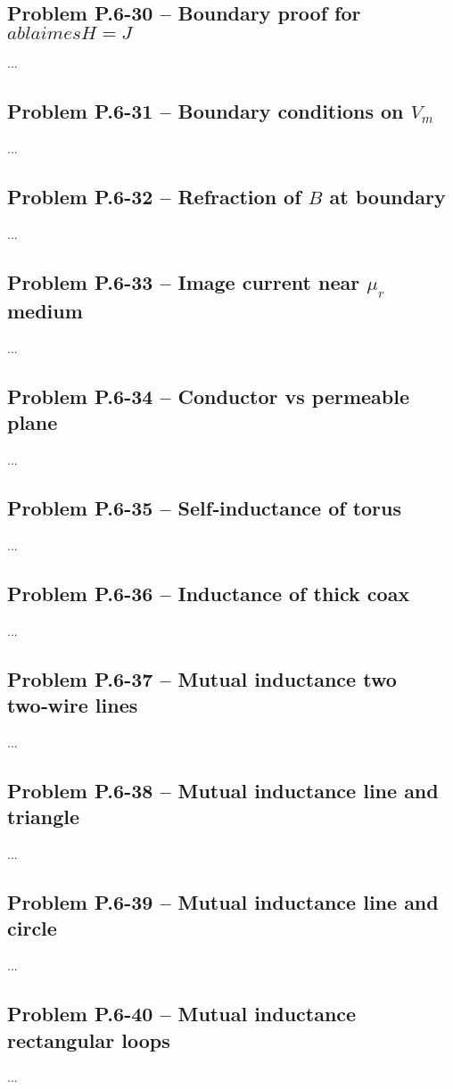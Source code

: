 \documentclass[12pt]{article}
\begin{document}
\subsection*{Problem P.6-30 – Boundary proof for $
abla	imes H=J$}
...
\bigskip
\subsection*{Problem P.6-31 – Boundary conditions on $V_m$}
...
\bigskip
\subsection*{Problem P.6-32 – Refraction of $B$ at boundary}
...
\bigskip
\subsection*{Problem P.6-33 – Image current near $\mu_r$ medium}
...
\bigskip
\subsection*{Problem P.6-34 – Conductor vs permeable plane}
...
\bigskip
\subsection*{Problem P.6-35 – Self‑inductance of torus}
...
\bigskip
\subsection*{Problem P.6-36 – Inductance of thick coax}
...
\bigskip
\subsection*{Problem P.6-37 – Mutual inductance two two‑wire lines}
...
\bigskip
\subsection*{Problem P.6-38 – Mutual inductance line and triangle}
...
\bigskip
\subsection*{Problem P.6-39 – Mutual inductance line and circle}
...
\bigskip
\subsection*{Problem P.6-40 – Mutual inductance rectangular loops}
...
\bigskip
\end{document}
